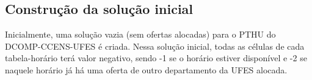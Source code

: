 
\subsection{Construção da solução inicial}
\label{sec-met-si}

Inicialmente, uma solução vazia (sem ofertas alocadas) para o PTHU do DCOMP-CCENS-UFES é criada. Nessa solução inicial, todas as células de cada tabela-horário terá valor negativo, sendo -1 se o horário estiver disponível e -2 se naquele horário já há uma oferta de outro departamento da UFES alocada.

